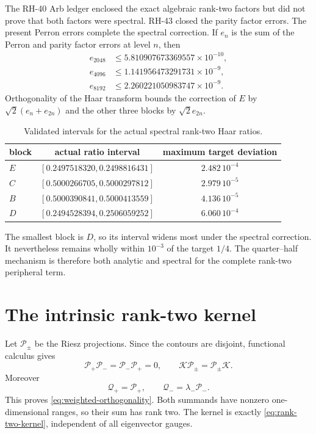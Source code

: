 \documentclass[11pt]{article}
\theoremstyle{definition}
\theoremstyle{remark}
\newcommand{\cK}{\mathcal K}
\newcommand{\cP}{\mathcal P}
\newcommand{\cQ}{\mathcal Q}
\begin{document}
The RH-40 Arb ledger enclosed the exact algebraic rank-two factors but did
not prove that both factors were spectral.  RH-43 closed the parity factor
errors.  The present Perron errors complete the spectral correction.  If
$e_n$ is the sum of the Perron and parity factor errors at level $n$, then
\begin{align}
 e_{2048}&\le5.810907673369557\times10^{-10},\nonumber\\
 e_{4096}&\le1.141956473291731\times10^{-9},\nonumber\\
 e_{8192}&\le2.260221050983747\times10^{-9}.
 \label{eq:combined-factor-errors}
\end{align}
Orthogonality of the Haar transform bounds the correction of $E$ by
$\sqrt2(e_n+e_{2n})$ and the other three blocks by $\sqrt2e_{2n}$.

\begin{table}[H]
\centering
\small
\caption{Validated intervals for the actual spectral rank-two Haar ratios.}
\label{tab:rank-two-ratios}
\begin{tabular}{@{}lcc@{}}
\toprule
block & actual ratio interval & maximum target deviation\\
\midrule
$E$ & $[0.2497518320,0.2498816431]$ & $2.482\,10^{-4}$\\
$C$ & $[0.5000266705,0.5000297812]$ & $2.979\,10^{-5}$\\
$B$ & $[0.5000390841,0.5000413559]$ & $4.136\,10^{-5}$\\
$D$ & $[0.2494528394,0.2506059252]$ & $6.060\,10^{-4}$\\
\bottomrule
\end{tabular}
\end{table}

The smallest block is $D$, so its interval widens most under the spectral
correction.  It nevertheless remains wholly within $10^{-3}$ of the target
$1/4$.  The quarter--half mechanism is therefore both analytic and spectral
for the complete rank-two peripheral term.

\section{The intrinsic rank-two kernel}
\label{sec:rank-two-kernel}

Let $\cP_\pm$ be the Riesz projections.  Since the contours are disjoint,
functional calculus gives
\begin{equation}
 \cP_+\cP_-=\cP_-\cP_+=0,
 \qquad
 \cK\cP_\pm=\cP_\pm\cK.
 \label{eq:projection-orthogonality}
\end{equation}
Moreover
\[
 \cQ_+=\cP_+,
 \qquad
 \cQ_-=\lambda_-\cP_-.
\]
This proves \eqref{eq:weighted-orthogonality}.  Both summands have nonzero
one-dimensional ranges, so their sum has rank two.  The kernel is exactly
\eqref{eq:rank-two-kernel}, independent of all eigenvector gauges.
\end{document}
